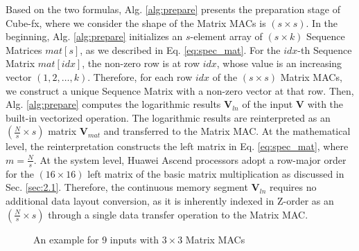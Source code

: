 Based on the two formulas, Alg. \ref{alg:prepare} presents the preparation stage of Cube-fx, where we consider the shape of the Matrix MACs is $(s \times s)$. In the beginning, Alg. \ref{alg:prepare} initializes an $s$-element array of $(s \times k)$ Sequence Matrices $mat[s]$, as we described in Eq. \ref{eq:spec_mat}. For the $idx$-th Sequence Matrix $mat[idx]$, the non-zero row is at row $idx$, whose value is an increasing vector $(1, 2, \dots, k)$. Therefore, for each row $idx$ of the $(s \times s)$ Matrix MACs, we construct a unique Sequence Matrix with a non-zero vector at that row. Then, Alg. \ref{alg:prepare} computes the logarithmic results $\textbf{V}_{ln}$ of the input $\textbf{V}$ with the built-in vectorized operation. The logarithmic results are reinterpreted as an $(\frac{N}{s} \times s)$ matrix $\textbf{V}_{mat}$ and transferred to the Matrix MAC. 
At the mathematical level, the reinterpretation constructs the left matrix in Eq. \ref{eq:spec_mat}, where $m = \frac{N}{s}$. At the system level, Huawei Ascend processors adopt a row-major order for the $(16 \times 16)$ left matrix of the basic matrix multiplication as discussed in Sec. \ref{sec:2.1}. Therefore, the continuous memory segment $\textbf{V}_{ln}$ requires no additional data layout conversion, as it is inherently indexed in Z-order as an $(\frac{N}{s} \times s)$ through a single data transfer operation to the Matrix MAC.

\begin{figure}[t]
    \caption{An example for 9 inputs with $3 \times 3$ Matrix MACs}
    \label{fig:trans_ln}
    \end{figure}

